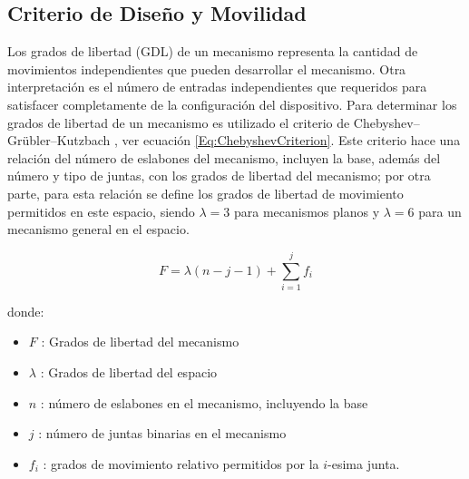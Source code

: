 
\subsection*{Criterio de Diseño y Movilidad}

Los grados de libertad (GDL) de un mecanismo representa la cantidad de movimientos independientes que pueden desarrollar el mecanismo. Otra interpretación es el número de entradas independientes que requeridos para satisfacer completamente de la configuración del dispositivo. Para determinar los grados de libertad de un mecanismo es utilizado el criterio de Chebyshev–Grübler–Kutzbach \citep{taghirad2013parallel}, ver ecuación \ref{Eq:ChebyshevCriterion}. Este criterio hace una relación del número de eslabones del mecanismo, incluyen la base, además del número y tipo de juntas, con los grados de libertad del mecanismo; por otra parte, para esta relación se define los grados de libertad de movimiento permitidos en este espacio, siendo $\lambda = 3$ para mecanismos planos y $\lambda = 6$ para un mecanismo general en el espacio.

\begin{equation}
    F = \lambda \left( n - j - 1 \right) + \sum_{i=1}^j f_i
    \label{Eq:ChebyshevCriterion}
\end{equation}

donde:
\begin{itemize} \nosep
    \item $F$ : Grados de libertad del mecanismo
    \item $\lambda$ : Grados de libertad del espacio
    \item $n$ : número de eslabones en el mecanismo, incluyendo la base
    \item $j$ : número de juntas binarias en el mecanismo
    \item $f_i$ : grados de movimiento relativo permitidos por la $i$-esima junta.
\end{itemize}

